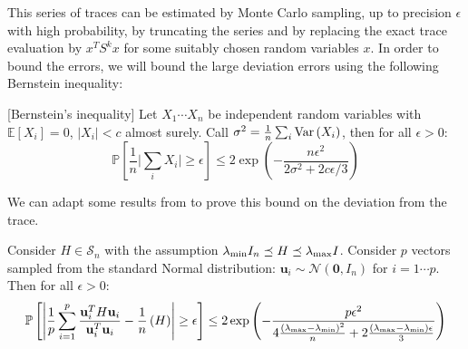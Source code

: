 This series of traces can be estimated by Monte Carlo sampling, up
to precision $\epsilon$ with high probability, by truncating the
series and by replacing the exact trace evaluation by $x^{T}S^{k}x$
for some suitably chosen random variables $x$. In order to bound
the errors, we will bound the large deviation errors using the following
Bernstein inequality: 
\begin{lemma}
{[}Bernstein's inequality{]} \label{lem:bernstein} Let $X_{1}\cdots X_{n}$
be independent random variables with $\mathbb{E}\left[X_{i}\right]=0$,
$\left|X_{i}\right|<c$ almost surely. Call $\sigma^{2}=\frac{1}{n}\sum_{i}\text{\textnormal{Var}}\left(X_{i}\right)$,
then for all $\epsilon>0$: 
\[
\mathbb{P}\left[\frac{1}{n}\Big|\sum_{i}X_{i}\Big|\geq\epsilon\right]\leq2\exp\left(-\frac{n\epsilon^{2}}{2\sigma^{2}+2c\epsilon/3}\right)
\]

\end{lemma}
We can adapt some results from \cite{Barry1999} to prove this bound
on the deviation from the trace. 
\begin{lemma}
\label{lem:bernstein-trace}Consider $H\in\mathcal{S}_{n}$ with the
assumption $\lambda_{\text{\textnormal{min}}}I_{n}\preceq H\preceq\lambda_{\text{\textnormal{max}}}I$.
Consider $p$ vectors sampled from the standard Normal distribution:
$\mathbf{u}_{i}\sim\mathcal{N}\left(\mathbf{0},I_{n}\right)$ for
$i=1\cdots p$. Then for all $\epsilon>0$: 
\[
\mathbb{P}\left[\left|\frac{1}{p}\sum_{i=1}^{p}\frac{\mathbf{u}_{i}^{T}H\mathbf{u}_{i}}{\mathbf{u}_{i}^{T}\mathbf{u}_{i}}-\frac{1}{n}\left(H\right)\right|\geq\epsilon\right] \leq 2\exp\left(-\frac{p\epsilon^{2}}{4\frac{\left(\lambda_{\max}-\lambda_{\min}\right)^{2}}{n}+2\frac{\left(\lambda_{\max}-\lambda_{\min}\right)\epsilon}{3}}\right)
\]
\end{lemma}
